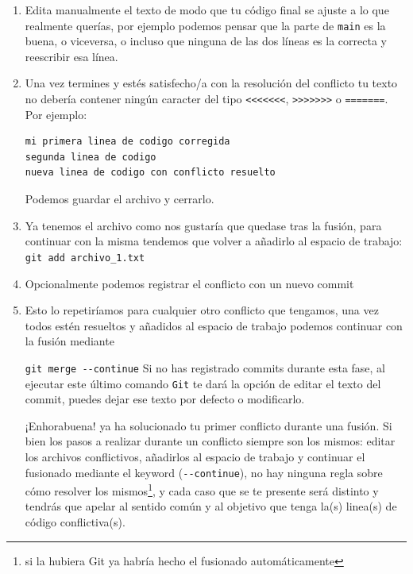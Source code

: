 \documentclass[a4paper,11pt]{report}
\newcommand{\cverb}{\Verb}
\begin{document}
\begin{enumerate}
    \item Edita manualmente el texto de modo que tu código final se ajuste a lo que realmente querías, por ejemplo podemos pensar que la parte de \verb+main+ es la buena, o viceversa, o incluso que ninguna de las dos líneas es la correcta y reescribir esa línea.
    
    \item Una vez termines y estés satisfecho/a con la resolución del conflicto tu texto no debería contener ningún caracter del tipo \verb+<<<<<<<+, \verb+>>>>>>>+ o \verb+=======+. Por ejemplo:
  
    \begin{lstlisting}[style=custom]
mi primera linea de codigo corregida
segunda linea de codigo
nueva linea de codigo con conflicto resuelto
    \end{lstlisting}
    
    Podemos guardar el archivo y cerrarlo.
    
    \item Ya tenemos el archivo como nos gustaría que quedase tras la fusión, para continuar con la misma tendemos que volver a añadirlo al espacio de trabajo:
    \cverb+git add archivo_1.txt+
    
    \item Opcionalmente podemos registrar el conflicto con un nuevo commit
    
    \item Esto lo repetiríamos para cualquier otro conflicto que tengamos, una vez todos estén resueltos y añadidos al espacio de trabajo podemos continuar con la fusión mediante
    
    \cverb+git merge --continue+
    Si no has registrado commits durante esta fase, al ejecutar este último comando \verb+Git+ te dará la opción de editar el texto del commit, puedes dejar ese texto por defecto o modificarlo.
    
    ¡Enhorabuena! ya ha solucionado tu primer conflicto durante una fusión. Si bien los pasos a realizar durante un conflicto siempre son los mismos: editar los archivos conflictivos, añadirlos al espacio de trabajo y continuar el fusionado mediante el keyword (\verb+--continue+), no hay ninguna regla sobre cómo resolver los mismos\footnote{si la hubiera Git ya habría hecho el fusionado automáticamente}, y cada caso que se te presente será distinto y tendrás que apelar al sentido común y al objetivo que tenga la(s) linea(s) de código conflictiva(s).
     
    \end{enumerate}
\end{document}
